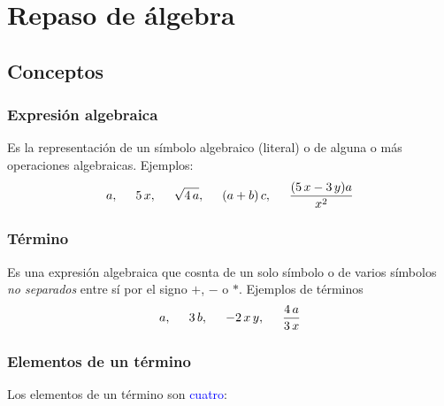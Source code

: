 \section{Repaso de álgebra}
\subsection{Conceptos}

\begin{frame}
\frametitle{Expresión algebraica}
Es la representación de un símbolo algebraico (literal) o de alguna o más operaciones algebraicas.
\pause
Ejemplos:
\begin{align*}
a, \hspace{0.5cm} 5 \, x, \hspace{0.5cm} \sqrt{4 \, a}, \hspace{0.5cm} (a + b) \, c, \hspace{0.5cm} \dfrac{(5 \, x - 3 \, y) a}{x^{2}}
\end{align*}
\end{frame}
\begin{frame}
\frametitle{Término}
Es una expresión algebraica que cosnta de un solo símbolo o de varios símbolos \emph{no separados} entre sí por el signo $+$, $-$ o $*$.
\pause
Ejemplos de términos
\begin{align*}
a, \hspace{0.5cm} 3 \, b, \hspace{0.5cm} -2 \, x \, y, \hspace{0.5cm} \dfrac{4 \, a}{3 \, x}
\end{align*}
\end{frame}
\begin{frame}
\frametitle{Elementos de un término}
Los elementos de un término son \textcolor{blue}{cuatro}:
\\[2em]
\pause
\begin{figure}[H]
\end{figure}
\end{frame}
